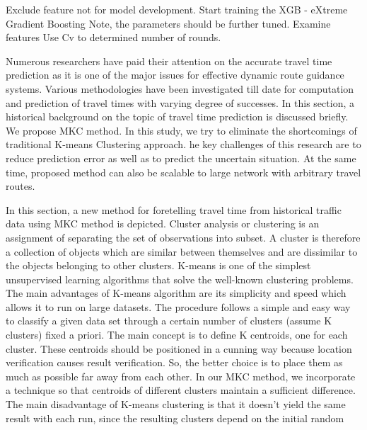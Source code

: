 \documentclass[12pt,report]{ucdavisthesis}
\begin{document}
        Exclude feature not for model development. Start training the XGB - eXtreme
        Gradient Boosting Note, the parameters should be further tuned. Examine
        features Use Cv to determined number of rounds.
        \par\hspace{2cm}
        \newpage Numerous researchers have paid their attention on the accurate travel time
        prediction as it is one of the major issues for effective dynamic route guidance
        systems. Various methodologies have been investigated till date for computation
        and prediction of travel times with varying degree of successes. In this section, a
        historical background on the topic of travel time prediction is discussed briefly.
        We propose MKC method. In this study, we try to eliminate the shortcomings of
        traditional K-means Clustering approach. he key challenges of this research are
        to reduce prediction error as well as to predict the uncertain situation. At the same
        time, proposed method can also be scalable to large network with arbitrary travel
        routes.
        \par\hspace{2cm} In this section, a new method for foretelling travel time from historical traffic
        data using MKC method is depicted. Cluster analysis or clustering is an
        assignment of separating the set of observations into subset. A cluster is therefore
        a collection of objects which are similar between themselves and are dissimilar
        to the objects belonging to other clusters. K-means is one of the simplest
        unsupervised learning algorithms that solve the well-known clustering problems.
        The main advantages of K-means algorithm are its simplicity and speed which
        allows it to run on large datasets. The procedure follows a simple and easy way
        to classify a given data set through a certain number of clusters (assume K
        clusters) fixed a priori. The main concept is to define K centroids, one for each
        cluster. These centroids should be positioned in a cunning way because location
        verification causes result verification. So, the better choice is to place them as
        much as possible far away from each other. In our MKC method, we incorporate
        a technique so that centroids of different clusters maintain a sufficient difference.
        The main disadvantage of K-means clustering is that it doesn’t yield the same
        result with each run, since the resulting clusters depend on the initial random
\end{document}

